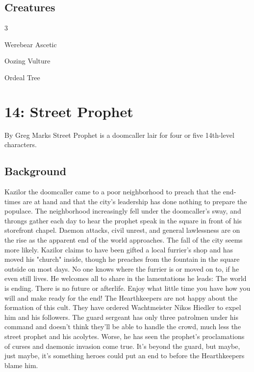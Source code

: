 \documentclass[10pt,a4paper,twoside,twocolumn,openany,bg=print,nodeprecatedcode]{dndbook}
\begin{document}
\section{Creatures}

\begin{itemize}
\begin{multicols}{3}
\item Werebear Ascetic
\item Oozing Vulture
\item Ordeal Tree
\end{multicols}

\end{itemize}

\chapter{14: Street Prophet}
By Greg Marks
Street Prophet is a doomcaller lair for four or five 14th-level characters.
\section{Background}
Kazilor the doomcaller came to a poor neighborhood to preach that the end-times are at hand and that the city's leadership has done nothing to prepare the populace. The neighborhood increasingly fell under the doomcaller's sway, and throngs gather each day to hear the prophet speak in the square in front of his storefront chapel. Daemon attacks, civil unrest, and general lawlessness are on the rise as the apparent end of the world approaches. The fall of the city seems more likely.
Kazilor claims to have been gifted a local furrier's shop and has moved his "church" inside, though he preaches from the fountain in the square outside on most days. No one knows where the furrier is or moved on to, if he even still lives. He welcomes all to share in the lamentations he leads: The world is ending. There is no future or afterlife. Enjoy what little time you have how you will and make ready for the end!
The Hearthkeepers are not happy about the formation of this cult. They have ordered Wachtmeister Nikos Hiedler to expel him and his followers. The guard sergeant has only three patrolmen under his command and doesn't think they'll be able to handle the crowd, much less the street prophet and his acolytes. Worse, he has seen the prophet's proclamations of curses and daemonic invasion come true. It's beyond the guard, but maybe, just maybe, it's something heroes could put an end to before the Hearthkeepers blame him.
\end{document}
